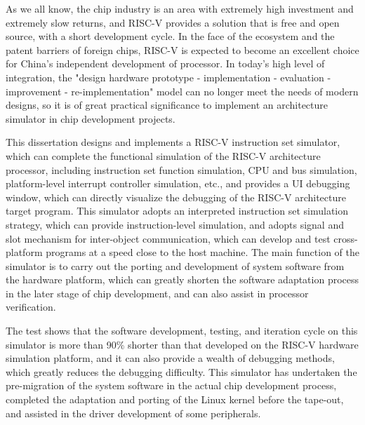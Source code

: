 \begin{abstract*}
  As we all know, the chip industry is an area with extremely high investment and extremely slow returns, and RISC-V provides a solution that is free and open source, with a short development cycle. In the face of the ecosystem and the patent barriers of foreign chips,  RISC-V is expected to become an excellent choice for China's independent development of processor. In today's high level of integration, the "design hardware prototype - implementation - evaluation - improvement - re-implementation" model can no longer meet the needs of modern designs, so it is of great practical significance to implement an architecture simulator in chip development projects.


  This dissertation designs and implements a RISC-V instruction set simulator, which can complete the functional simulation of the RISC-V architecture processor, including instruction set function simulation, CPU and bus simulation, platform-level interrupt controller simulation, etc., and provides a UI debugging window, which can directly visualize the debugging of the RISC-V architecture target program. This simulator adopts an interpreted instruction set simulation strategy, which can provide instruction-level simulation, and adopts signal and slot mechanism for inter-object communication, which can develop and test cross-platform programs at a speed close to the host machine. The main function of the simulator is to carry out the porting and development of system software from the hardware platform, which can greatly shorten the software adaptation process in the later stage of chip development, and can also assist in processor verification.

  
  The test shows that the software development, testing, and iteration cycle on this simulator is more than 90\% shorter than that developed on the RISC-V hardware simulation platform, and it can also provide a wealth of debugging methods, which greatly reduces the debugging difficulty. This simulator has undertaken the pre-migration of the system software in the actual chip development process, completed the adaptation and porting of the Linux kernel before the tape-out, and assisted in the driver development of some peripherals.
\end{abstract*}
